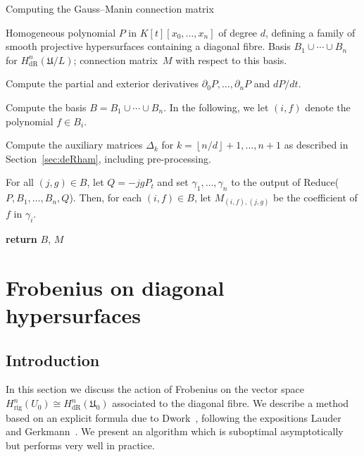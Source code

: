 \documentclass[a4paper,11pt]{article}
\numberwithin{equation}{section}
\providecommand{\floor}[1]{\left\lfloor#1\right\rfloor}   %
\providecommand{\HdR}{H_{\text{dR}}}    %
\providecommand{\Hrig}{H_{\text{rig}}}  %
\theoremstyle{definition}
\begin{document}
\begin{algorithm}
\caption{Computing the Gauss--Manin connection matrix}
\label{alg:Connection}
\begin{algorithmic}
\Require Homogeneous polynomial $P$ in $K[t][x_0, \dotsc, x_n]$ of degree $d$, 
         defining a family of smooth projective hypersurfaces containing 
         a diagonal fibre.
\Ensure  Basis $B_1 \cup \dotsb \cup B_n$ for 
         $\HdR^n(\mathfrak{U}/L)$;  connection matrix~$M$ with 
         respect to this basis.
\State \begin{compactenum}[\it {Step} I.] \vspace{-1.24em}
\item Compute the partial and exterior derivatives 
      $\partial_0 P, \dotsc, \partial_n P$ and $dP/dt$.
\item Compute the basis $B = B_1 \cup \dotsb \cup B_n$.  In the following, 
      we let $(i,f)$ denote the polynomial $f \in B_i$.
\item Compute the auxiliary matrices $\Delta_k$ for 
      $k = \floor{n/d}+1, \dotsc, n+1$ as described 
      in Section~\ref{sec:deRham}, including pre-processing.
\item For all $(j, g) \in B$, let $Q = -j g P_t$ and set 
      $\gamma_{1}, \dotsc, \gamma_n$ to the output of 
      {\sc Reduce($P, B_1, \dotsc, B_n, Q$)}.  
      Then, for each $(i, f) \in B$, let $M_{(i,f),(j,g)}$ 
      be the coefficient of $f$ in $\gamma_i$.
\item \textbf{return} $B$, $M$
\end{compactenum}
\EndProcedure
\end{algorithmic}
\end{algorithm}


\section{Frobenius on diagonal hypersurfaces}
\label{sec:Diagonal}

\subsection{Introduction}

In this section we discuss the action of Frobenius on the vector 
space $\Hrig^{n}(U_0) \cong \HdR^{n}(\mathfrak{U}_0)$ associated 
to the diagonal fibre.  We describe a method based on an explicit 
formula due to Dwork~\citep[\S 4]{Dwork1964}, following the expositions 
Lauder~\citep[\S 6]{Lauder2004b} and Gerkmann~\citep[\S 4.4]{Gerkmann2007}. 
We present an algorithm which is suboptimal asymptotically but 
performs very well in practice.
\end{document}
